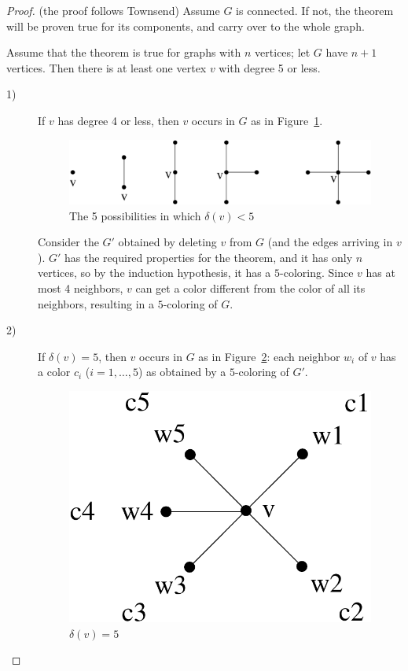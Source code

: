 \begin{proof} (the proof follows Townsend)
Assume $G$ is connected.
If not, the theorem will be proven true for its components, and carry
over to the whole graph.
{Assume that the theorem is true for
graphs with $n$ vertices; let $G$ have $n+1$ vertices. Then there is
at least one vertex $v$ with degree 5 or less.
\begin{description}
\item[1)]
If $v$ has degree 4 or less, then $v$ occurs in $G$ as in
Figure~\ref{5kleuring1}.

\begin{figure}[ht]
\begin{center}
\includegraphics[width=0.6\linewidth,keepaspectratio]{5kleuring1}
\end{center}
\caption{The 5 possibilities in which $\delta(v) < 5$ \label{5kleuring1}}
\end{figure}

Consider the $G'$ obtained by deleting $v$ from $G$ (and the edges
arriving in $v$). $G'$ has the required properties for the theorem,
and it has only $n$ vertices, so by the induction hypothesis, it has a
$5$-coloring. Since $v$ has at most 4 neighbors, $v$ can get a color
different from the color of all its neighbors, resulting in a
$5$-coloring of $G$.

\item[2)]
If $\delta(v) = 5$, then $v$ occurs in $G$ as in
Figure~\ref{5kleuring2}: each neighbor $w_{i}$ of $v$ has a color
$c_{i}$ ($i = 1,\ldots,5$) as obtained by a $5$-coloring of $G'$.

\begin{figure}[ht]
\begin{center}
\includegraphics[width=0.25\linewidth,keepaspectratio]{5kleuring2}
\end{center}
\caption{$\delta(v) = 5$ \label{5kleuring2}}
\end{figure}


\end{description}}
\end{proof}
